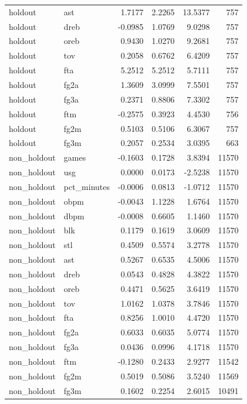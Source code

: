 \begin{table}
\begin{tabular}{llrrrr}
holdout & ast & 1.7177 & 2.2265 & 13.5377 & 757 \\
holdout & dreb & -0.0985 & 1.0769 & 9.0298 & 757 \\
holdout & oreb & 0.9430 & 1.0270 & 9.2681 & 757 \\
holdout & tov & 0.2058 & 0.6762 & 6.4209 & 757 \\
holdout & fta & 5.2512 & 5.2512 & 5.7111 & 757 \\
holdout & fg2a & 1.3609 & 3.0999 & 7.5501 & 757 \\
holdout & fg3a & 0.2371 & 0.8806 & 7.3302 & 757 \\
holdout & ftm & -0.2575 & 0.3923 & 4.4530 & 756 \\
holdout & fg2m & 0.5103 & 0.5106 & 6.3067 & 757 \\
holdout & fg3m & 0.2057 & 0.2534 & 3.0395 & 663 \\
non\_holdout & games & -0.1603 & 0.1728 & 3.8394 & 11570 \\
non\_holdout & usg & 0.0000 & 0.0173 & -2.5238 & 11570 \\
non\_holdout & pct\_minutes & -0.0006 & 0.0813 & -1.0712 & 11570 \\
non\_holdout & obpm & -0.0043 & 1.1228 & 1.6764 & 11570 \\
non\_holdout & dbpm & -0.0008 & 0.6605 & 1.1460 & 11570 \\
non\_holdout & blk & 0.1179 & 0.1619 & 3.0609 & 11570 \\
non\_holdout & stl & 0.4509 & 0.5574 & 3.2778 & 11570 \\
non\_holdout & ast & 0.5267 & 0.6535 & 4.5006 & 11570 \\
non\_holdout & dreb & 0.0543 & 0.4828 & 4.3822 & 11570 \\
non\_holdout & oreb & 0.4471 & 0.5625 & 3.6419 & 11570 \\
non\_holdout & tov & 1.0162 & 1.0378 & 3.7846 & 11570 \\
non\_holdout & fta & 0.8256 & 1.0010 & 4.4720 & 11570 \\
non\_holdout & fg2a & 0.6033 & 0.6035 & 5.0774 & 11570 \\
non\_holdout & fg3a & 0.0436 & 0.0996 & 4.1718 & 11570 \\
non\_holdout & ftm & -0.1280 & 0.2433 & 2.9277 & 11542 \\
non\_holdout & fg2m & 0.5019 & 0.5086 & 3.5240 & 11569 \\
non\_holdout & fg3m & 0.1602 & 0.2254 & 2.6015 & 10491 \\
\bottomrule
\end{tabular}
\end{table}
